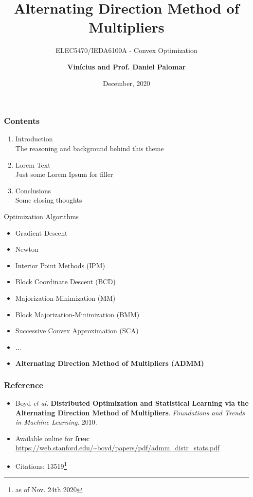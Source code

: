 \documentclass[aspectratio=169]{beamer}
\title{Alternating Direction Method of Multipliers}
\subtitle{\large{ELEC5470/IEDA6100A - Convex Optimization}}
\author{\normalsize{\textbf{Vin\'icius and Prof. Daniel Palomar}}}
\date{December, 2020}
\begin{document}
	\setcounter{showProgressBar}{0}
	\setcounter{showSlideNumbers}{0}

	\frame{\titlepage}

	\begin{frame}
	  \frametitle{Contents}
	  \begin{enumerate}
	  \item Introduction \\ \textcolor{ExecusharesGrey}{\footnotesize\hspace{1em} The reasoning and background behind this theme}
	  \item Lorem Text  \\ \textcolor{ExecusharesGrey}{\footnotesize\hspace{1em} Just some Lorem Ipsum for filler}
          \item Conclusions \\ \textcolor{ExecusharesGrey}{\footnotesize\hspace{1em} Some closing thoughts}
	  \end{enumerate}
	\end{frame}

	\setcounter{framenumber}{0}
	\setcounter{showProgressBar}{1}
	\setcounter{showSlideNumbers}{1}

        \begin{frame}{Optimization Algorithms}
          \begin{itemize}
            \item Gradient Descent
            \item Newton
            \item Interior Point Methods (IPM)
            \item Block Coordinate Descent (BCD)
            \item Majorization-Minimization (MM)
            \item Block Majorization-Minimization (BMM)
            \item Successive Convex Approximation (SCA)
            \pause
            \item ...
            \pause
            \item \bf{Alternating Direction Method of Multipliers (ADMM)}
          \end{itemize}
        \end{frame}
	\begin{frame}
	  \frametitle{Reference}
          \begin{itemize}
            \item Boyd \textit{et al.} \textbf{Distributed Optimization and Statistical Learning via the Alternating Direction Method of Multipliers}.
              \textit{Foundations and Trends in Machine Learning}. 2010.
            \item Available online for \textbf{free}: \url{https://web.stanford.edu/\~boyd/papers/pdf/admm\_distr\_stats.pdf}
            \item Citations: 13519\footnote{as of Nov. 24th 2020}
          \end{itemize}
	\end{frame}
\end{document}

